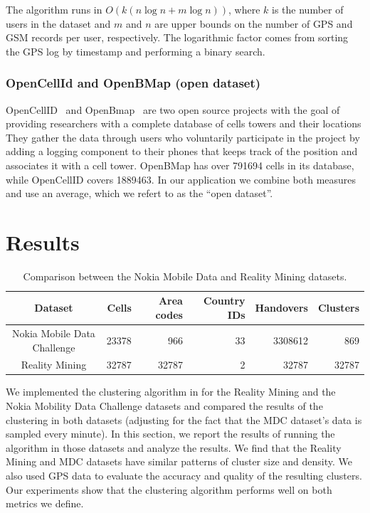 \documentclass[letterpaper, 12pt, conference]{ieeeconf}
\begin{document}
The algorithm runs in $O(k(n\log n + m\log n))$, where $k$ is the number of 
users in the dataset and $m$ and $n$ are upper bounds on the number of GPS 
and GSM records per user, respectively. The logarithmic factor comes from 
sorting the GPS log by timestamp and performing a binary search.

\subsubsection{OpenCellId and OpenBMap (open dataset)}

OpenCellID~\cite{openCellId} and OpenBmap~\cite{openBMap} are two open source 
projects with the goal of providing researchers with a complete database of 
cells towers and their locations They gather the data through users who 
voluntarily participate in the project by adding a logging component to their 
phones that keeps track of the position and associates it with a cell tower. 
OpenBMap has over 791694 cells in its database, while OpenCellID covers 
1889463. In our application we combine both measures and use an average, 
which we refert to as the ``open dataset''.

\section{Results}
\label{sec:results}

\begin{table}
    \centering
    \begin{tabular}{ | c || r | r | r | r | r | }
    \hline
    Dataset & Cells  & Area codes & Country IDs & Handovers & Clusters \\
    \hline
    Nokia Mobile Data Challenge & 23378 & 966 & 33 & 3308612 & 869 \\
    \hline
    Reality Mining & 32787 & 32787 & 2 & 32787 & 32787 \\
    \hline
    \end{tabular}
\caption{Comparison between the Nokia Mobile Data and Reality Mining datasets.}
\label{tbl:datasetComparison}
\end{table}


We implemented the clustering algorithm in \cite{mobilityprofiler} for the 
Reality Mining and the Nokia Mobility Data Challenge datasets and compared 
the results of the clustering in both datasets (adjusting for the fact that 
the MDC dataset's data is sampled every minute). In this section, we report 
the results of running the algorithm in those datasets and analyze the 
results. We find that the Reality Mining and MDC datasets have similar 
patterns of cluster size and density. We also used GPS data to evaluate the 
accuracy and quality of the resulting clusters. Our experiments show that the 
clustering algorithm performs well on both metrics we define.
\end{document}
